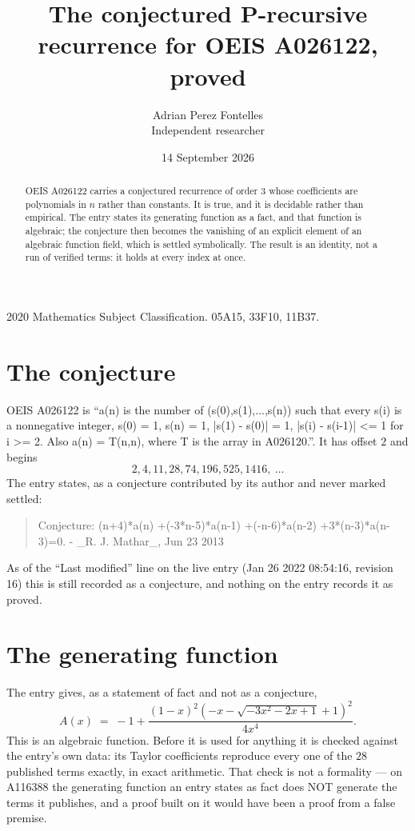 \documentclass[11pt,a4paper]{article}
\title{The conjectured P-recursive recurrence for OEIS A026122, proved}
\author{Adrian Perez Fontelles\\ \small Independent researcher}
\date{14 September 2026}
\theoremstyle{plain}
\theoremstyle{definition}
\begin{document}
\maketitle

\begin{abstract}
OEIS A026122 carries a conjectured recurrence of order $3$ whose coefficients are polynomials in
$n$ rather than constants. It is true, and it is decidable rather than empirical. The entry
states its generating function as a fact, and that function is algebraic; the conjecture then
becomes the vanishing of an explicit element of an algebraic function field, which is settled
symbolically. The result is an identity, not a run of verified terms: it holds at every index
at once.
\end{abstract}

\noindent\small 2020 Mathematics Subject Classification. 05A15, 33F10, 11B37.\normalsize

\section{The conjecture}

OEIS A026122 is ``a(n) is the number of (s(0),s(1),...,s(n)) such that every s(i) is a nonnegative integer, s(0) = 1, s(n) = 1, |s(1) - s(0)| = 1, |s(i) - s(i-1)| <= 1 for i >= 2. Also a(n) = T(n,n), where T is the array in A026120.''. It has offset $2$ and begins
\[
2, 4, 11, 28, 74, 196, 525, 1416,\ \dots
\]
The entry states, as a conjecture contributed by its author and never marked settled:
\begin{quote}\raggedright\small
Conjecture: (n+4)*a(n) +(-3*n-5)*a(n-1) +(-n-6)*a(n-2) +3*(n-3)*a(n-3)=0. - \_R. J. Mathar\_, Jun 23 2013
\end{quote}
As of the ``Last modified'' line on the live entry (Jan 26 2022 08:54:16, revision 16)
this is still recorded as a conjecture, and nothing on the entry records it as proved.

\section{The generating function}

The entry gives, as a statement of fact and not as a conjecture,
\[
A(x)\;=\;-1 + \frac{\left(1 - x\right)^{2} \left(- x - \sqrt{- 3 x^{2} - 2 x + 1} + 1\right)^{2}}{4 x^{4}} .
\]
This is an algebraic function. Before it is used for anything it is checked against the entry's
own data: its Taylor coefficients reproduce every one of the $28$ published terms
exactly, in exact arithmetic. That check is not a formality --- on A116388 the generating
function an entry states as fact does NOT generate the terms it publishes, and a proof built on
it would have been a proof from a false premise.
\end{document}
